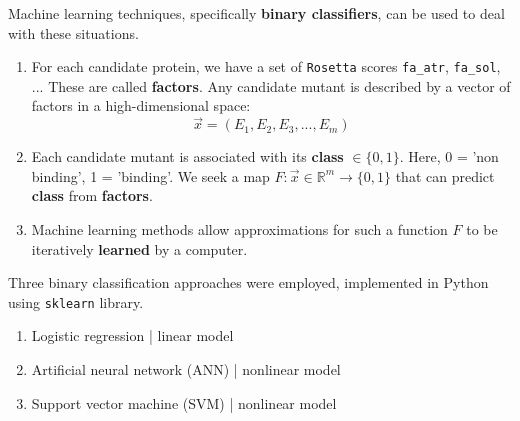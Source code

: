 \documentclass{beamer}
\begin{document}
\begin{frame}
    Machine learning techniques, specifically \textbf{binary classifiers}, can be used to deal with these situations.
\begin{enumerate}
\item For each candidate protein, we have a set of \texttt{Rosetta} scores \texttt{fa\_atr}, \texttt{fa\_sol}, ...
    These are called \textbf{factors}. Any candidate mutant is described by a vector of factors in a high-dimensional space:
    $$\vec{x} = (E_1, E_2, E_3, ..., E_m)$$
    
    \item Each candidate mutant is associated with its \textbf{class} $\in \{0, 1\}$. Here, 0 = 'non binding', 1 = 'binding'. We seek a map $F : \vec{x} \in \mathbb{R}^m \to \{0, 1\}$ that can predict \textbf{class} from \textbf{factors}.
    
    \item Machine learning methods allow approximations for such a function $F$ to be iteratively \textbf{learned} by a computer.
\end{enumerate}
\end{frame}

\begin{frame}
    Three binary classification approaches were employed, implemented in Python using \texttt{sklearn} library.
    \begin{enumerate}
        \item Logistic regression | linear model
    \item Artificial neural network (ANN) | nonlinear model
        \item Support vector machine (SVM) | nonlinear model
    \end{enumerate}
\end{frame}
\end{document}

